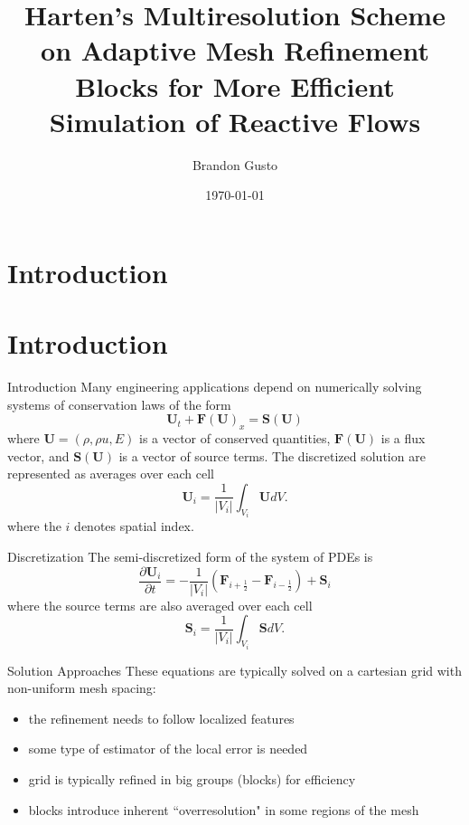\documentclass{beamer}
\begin{document}
\section{Introduction}
\title{Harten's Multiresolution Scheme on Adaptive Mesh Refinement Blocks for More Efficient Simulation of Reactive Flows}
\author{Brandon Gusto} %
\date{\today}
\frame{\titlepage}

\section{Introduction}

\begin{frame}{Introduction}
    Many engineering applications depend on numerically solving systems of conservation laws of the form
    \begin{equation*}
        \mathbf{U}_{t} + \mathbf{F}(\mathbf{U})_{x} = \mathbf{S}(\mathbf{U})
    \end{equation*}
    where $\mathbf{U} = (\rho,\rho u,E)$ is a vector of conserved quantities,
    $\mathbf{F}(\mathbf{U})$ is a flux vector, and $\mathbf{S}(\mathbf{U})$ is a
    vector of source terms. The discretized solution are represented as
    averages over each cell
    \begin{equation*}
        \mathbf{U}_{i} = \frac{1}{|V_{i}|} \int_{V_{i}} \mathbf{U} dV.
    \end{equation*}
    where the $i$ denotes spatial index.
\end{frame}

\begin{frame}{Discretization}
    The semi-discretized form of the system of PDEs is
    \begin{equation*}
        \frac{\partial \mathbf{U}_{i}}{\partial t} = -\frac{1}{|V_{i}|} \left( \mathbf{F}_{i+\frac{1}{2}}
            - \mathbf{F}_{i-\frac{1}{2}} \right) + \mathbf{S}_{i}
    \end{equation*}
    where the source terms are also averaged over each cell
    \begin{equation*}
        \mathbf{S}_{i} = \frac{1}{|V_{i}|} \int_{V_{i}} \mathbf{S} dV.
    \end{equation*}

\end{frame}

\begin{frame}{Solution Approaches}
    These equations are typically solved on a cartesian grid with non-uniform mesh spacing:
    \begin{itemize}
        \item<2-> the refinement needs to follow localized features
        \item<3-> some type of estimator of the local error is needed
        \item<4-> grid is typically refined in big groups (blocks) for efficiency
        \item<5-> blocks introduce inherent ``overresolution" in some regions of the mesh
    \end{itemize}
\end{frame}
\end{document}
